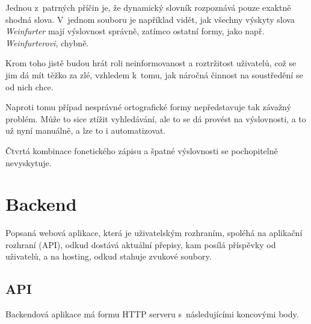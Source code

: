 Jednou z~patrných příčin je, že dynamický slovník rozpoznává pouze exaktně
shodná slova. V~jednom souboru je například vidět, jak všechny výskyty slova
{\em Weinfurter} mají výslovnost správně, zatímco ostatní formy, jako např. {\em
Weinfurterovi}, chybně.

Krom toho jistě budou hrát roli neinformovanost a roztržitost uživatelů, což se
jim dá mít těžko za zlé, vzhledem k~tomu, jak náročná činnost na soustředění se
od nich chce.

Naproti tomu případ nesprávné ortografické formy nepředstavuje tak závažný
problém. Může to sice ztížit vyhledávání, ale to se dá provést na výslovnosti, a
to už nyní manuálně, a lze to i automatizovat.

Čtvrtá kombinace fonetického zápisu a špatné výslovnosti se pochopitelně
nevyskytuje.

\normalfont 

\section{Backend}

Popsaná webová aplikace, která je uživatelským rozhraním, spoléhá na aplikační
rozhraní (API), odkud dostává aktuální přepisy, kam posílá příspěvky od
uživatelů, a na hosting, odkud stahuje zvukové soubory.

\subsection{API}

Backendová aplikace má formu HTTP serveru s~následujícími koncovými body.

